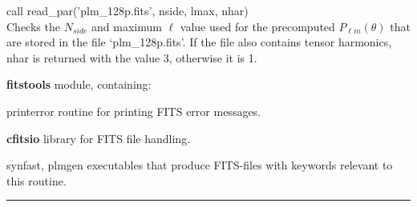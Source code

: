 \begin{example}
{
call read\_par('plm\_128p.fits', nside, lmax, nhar)  \\
}
{
Checks the $N_{side}$ and maximum $\ell$ value used for the precomputed $P_{\ell
  m}(\theta)$ that are stored in the file `plm\_128p.fits'. If the file also contains tensor harmonics, nhar is returned with the value 3, otherwise it is 1.
}
\end{example}
\begin{modules}
  \begin{sulist}{} %
  \item[\textbf{fitstools}] module, containing:
  \item[printerror] routine for printing FITS error messages.
  \item[\textbf{cfitsio}] library for FITS file handling.		
  \end{sulist}
\end{modules}

\begin{related}
  \begin{sulist}{} %
  \item[synfast, plmgen] executables that produce FITS-files with keywords relevant to this routine.
  \end{sulist}
\end{related}

\rule{\hsize}{2mm}

\newpage
